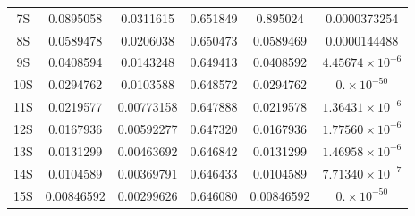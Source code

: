 \documentclass[cs4size,titlepage,twoside]{ctexart}
\begin{document}
\begin{table}[!tp]
\begin{tabular}{|cccccc|}
		7S                    & 0.0895058                          & 0.0311615                                & 0.651849                                 & 0.895024                                                                     & 0.0000373254             \\
		8S                    & 0.0589478                          & 0.0206038                                & 0.650473                                 & 0.0589469                                                                    & 0.0000144488             \\
		9S                    & 0.0408594                          & 0.0143248                                & 0.649413                                 & 0.0408592                                                                    & $4.45674\times10^{-6}$   \\
		10S                   & 0.0294762                          & 0.0103588                                & 0.648572                                 & 0.0294762                                                                    & $0.\times10^{-50}$       \\
		11S                   & 0.0219577                          & 0.00773158                               & 0.647888                                 & 0.0219578                                                                    & $1.36431\times10^{-6}$   \\
		12S                   & 0.0167936                          & 0.00592277                               & 0.647320                                 & 0.0167936                                                                    & $1.77560\times10^{-6}$   \\
		13S                   & 0.0131299                          & 0.00463692                               & 0.646842                                 & 0.0131299                                                                    & $1.46958\times10^{-6}$   \\
		14S                   & 0.0104589                          & 0.00369791                               & 0.646433                                 & 0.0104589                                                                    & $7.71340\times10^{-7}$   \\
		15S                   & 0.00846592                         & 0.00299626                               & 0.646080                                 & 0.00846592                                                                   & $0.\times10^{-50}$       \\

\end{tabular}
\end{table}
\end{document}
